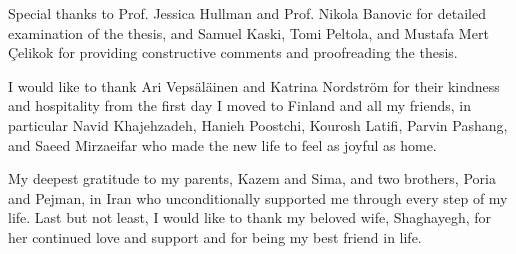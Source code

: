 \documentclass[dissertation,math,vertlayout,pdfa,colorlinks]{aaltoseries}
\begin{document}
\begin{preface}[Espoo]
Special thanks to Prof. Jessica Hullman and Prof. Nikola Banovic for detailed examination of the thesis,
and Samuel Kaski, Tomi Peltola, and Mustafa Mert \c{C}elikok for providing constructive comments and proofreading the thesis.

I would like to thank Ari Vepsäläinen and Katrina Nordström for their kindness and hospitality from the first day I moved to Finland and all my friends, in particular Navid Khajehzadeh, Hanieh Poostchi, Kourosh Latifi, Parvin Pashang, and Saeed Mirzaeifar who made the new life to feel as joyful as home. %

My deepest gratitude to my parents, Kazem and Sima, and two brothers, Poria and Pejman, in Iran who unconditionally supported me through every step of my life. Last but not least, I would like to thank my beloved wife, Shaghayegh, for her continued love and support and for being my best friend in life.

\end{preface}

\clearpage
\tableofcontents


\listofpublications






\end{document}
